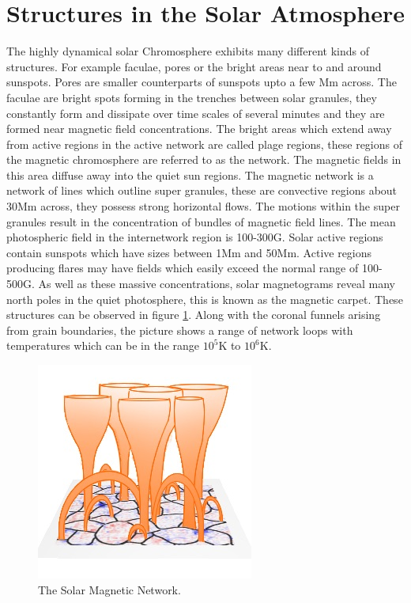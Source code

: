 \documentclass{aastex62}
\begin{document}
\section{Structures in the Solar Atmosphere } \label{sec:structures}
The highly dynamical solar Chromosphere exhibits many different kinds of structures. For example faculae, pores or the bright areas near to and around sunspots. Pores are smaller counterparts of sunspots upto a few Mm across. The faculae are bright spots forming in the trenches between solar granules, they constantly form and dissipate over time scales of several minutes and they are formed near magnetic field concentrations.   The bright areas which extend away from active regions in the active network are called plage regions, these regions of the magnetic chromosphere are referred to as the network. The magnetic fields in this area diffuse away into the quiet sun regions. The magnetic network is a network of lines which outline super granules, these are convective regions about 30Mm across, they possess strong horizontal flows. The motions within the super granules result in the concentration of bundles of magnetic field lines.  The mean photospheric field in the internetwork region is 100-300G.  Solar active regions contain sunspots which have sizes between 1Mm and 50Mm. Active regions producing flares may have fields which easily exceed the normal range of 100-500G. As well as these massive concentrations, solar magnetograms reveal many north poles in the quiet photosphere, this is known as the magnetic carpet. These structures can be observed in figure \ref{magneticnetwork}. Along with the coronal funnels arising from grain boundaries, the picture shows a range of network loops with temperatures which can be in the range $10^{5}$K to $10^{6}$K.


\begin{figure}[h]\label{magneticnetwork}
\includegraphics[scale=1.0]{imrescale/solar-network-v1.jpg}
\caption{The Solar Magnetic Network.}
\end{figure}
\end{document}
